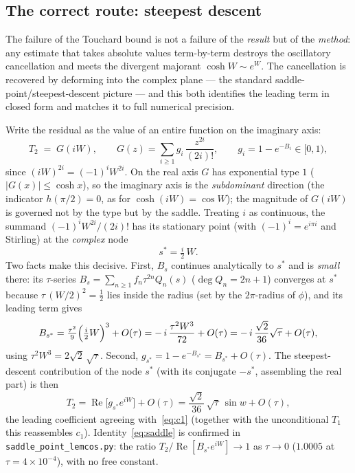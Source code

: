 \subsection{The correct route: steepest descent}\label{ss:saddle}

The failure of the Touchard bound is not a failure of the \emph{result} but of the
\emph{method}: any estimate that takes absolute values term-by-term destroys the
oscillatory cancellation and meets the divergent majorant $\cosh W\sim e^{W}$. The
cancellation is recovered by deforming into the complex plane --- the standard
saddle-point/steepest-descent picture --- and this both identifies the leading term
in closed form and matches it to full numerical precision.

Write the residual as the value of an entire function on the imaginary axis:
\[
  T_2 \;=\; G(iW),\qquad G(z)=\sum_{i\ge1} g_i\,\frac{z^{2i}}{(2i)!},\qquad
  g_i=1-e^{-B_i}\in[0,1),
\]
since $(iW)^{2i}=(-1)^iW^{2i}$. On the real axis $G$ has exponential type $1$
($|G(x)|\le\cosh x$), so the imaginary axis is the \emph{subdominant} direction
(the indicator $h(\pi/2)=0$, as for $\cosh(iW)=\cos W$); the magnitude of $G(iW)$ is
governed not by the type but by the saddle. Treating $i$ as continuous, the summand
$(-1)^i W^{2i}/(2i)!$ has its stationary point (with $(-1)^i=e^{i\pi i}$ and Stirling)
at the \emph{complex} node
\[
  s^\ast=\tfrac{i}{2}\,W .
\]
Two facts make this decisive. First, $B_s$ continues analytically to $s^\ast$ and is
\emph{small} there: its $\tau$-series $B_s=\sum_{n\ge1}f_n\tau^{2n}Q_n(s)$
($\deg Q_n=2n{+}1$) converges at $s^\ast$ because $\tau\,(W/2)^2=\tfrac12$ lies inside
the radius (set by the $2\pi$-radius of $\phi$), and its leading term gives
\[
  B_{s^\ast}=\tfrac{\tau^2}{9}\Bigl(\tfrac{i}{2}W\Bigr)^{3}+O(\tau)
  =-\,i\,\frac{\tau^2W^3}{72}+O(\tau)
  =-\,i\,\frac{\sqrt2}{36}\sqrt\tau+O(\tau),
\]
using $\tau^2W^3=2\sqrt2\,\sqrt\tau$. Second, $g_{s^\ast}=1-e^{-B_{s^\ast}}=B_{s^\ast}+O(\tau)$.
The steepest-descent contribution of the node $s^\ast$ (with its conjugate $-s^\ast$,
assembling the real part) is then
\begin{equation}\label{eq:saddle}
  T_2=\operatorname{Re}\!\bigl[g_{s^\ast}e^{iW}\bigr]+O(\tau)
     =\frac{\sqrt2}{36}\,\sqrt\tau\,\sin w+O(\tau),
\end{equation}
the leading coefficient agreeing with~\eqref{eq:c1} \textup(together with the
unconditional $T_1$ this reassembles $c_1$\textup). Identity~\eqref{eq:saddle} is
confirmed in \texttt{saddle\_point\_lemcos.py}: the ratio $T_2/\operatorname{Re}[B_{s^\ast}e^{iW}]\to1$
as $\tau\to0$ \textup($1.0005$ at $\tau=4\times10^{-4}$\textup), with no free constant.


